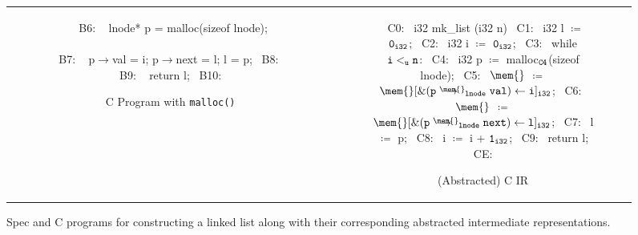 \begin{figure}[H]
\begin{tabular}{cc}
\begin{subfigure}[b]{0.565\textwidth}
\begin{center}
\begin{allLangEnvScript}
{{~{\tiny \textcolor{mygray}{B6: }}~     lnode* p = malloc(sizeof lnode);                       $\phantom{\mem{} \coloneqq {\tt \mem{}[\&  (\structPointer{\tt p}{\mem{}}{lnode}{next}) \leftarrow l]_{i32}};}$
~{\tiny \textcolor{mygray}{B7: }}~     p$\rightarrow$val = i; p$\rightarrow$next = l; l = p;
~{\tiny \textcolor{mygray}{B8: }}~   }
~{\tiny \textcolor{mygray}{B9: }}~   return l;
~{\tiny \textcolor{mygray}{B10:}}~ }
\end{allLangEnvScript}
\end{center}
\caption{\label{fig:llAllocC}C Program with {\tt malloc()}}
\end{subfigure}%
&
\begin{subfigure}[b]{0.435\textwidth}
\begin{center}
\begin{allLangEnvScript}
~{\tiny \textcolor{mygray}{C0:}}~ i32 mk_list (i32 n) {
~{\tiny \textcolor{mygray}{C1:}}~   i32 l $\coloneqq$ ${\tt 0_{i32}}$;
~{\tiny \textcolor{mygray}{C2:}}~   i32 i $\coloneqq$ ${\tt 0_{i32}}$;
~{\tiny \textcolor{mygray}{C3:}}~   while ${\tt i <_{u} n}$:
~{\tiny \textcolor{mygray}{C4:}}~     i32 p $\coloneqq$ malloc$_{\tt C4}$(sizeof lnode);
~{\tiny \textcolor{mygray}{C5:}}~     $\mem{}$ $\coloneqq$ ${\tt \mem{}[ \& (\structPointer{\tt p}{\mem{}}{lnode}{val}) \leftarrow i]_{i32}}$;
~{\tiny \textcolor{mygray}{C6:}}~     $\mem{}$ $\coloneqq$ ${\tt \mem{}[\&  (\structPointer{\tt p}{\mem{}}{lnode}{next}) \leftarrow l]_{i32}}$;
~{\tiny \textcolor{mygray}{C7:}}~     l $\coloneqq$ p;
~{\tiny \textcolor{mygray}{C8:}}~     i $\coloneqq$ i + ${\tt 1_{i32}}$;
~{\tiny \textcolor{mygray}{C9:}}~   return l;
~{\tiny \textcolor{mygray}{CE:}}~ }
\end{allLangEnvScript}
\end{center}
\caption{\label{fig:llAllocCIR}(Abstracted) C IR}
\end{subfigure}%
\\
\end{tabular}
\caption{\label{fig:llAllocSpecAndC}Spec and C programs for constructing a linked list along with their corresponding abstracted intermediate representations.}
\end{figure}